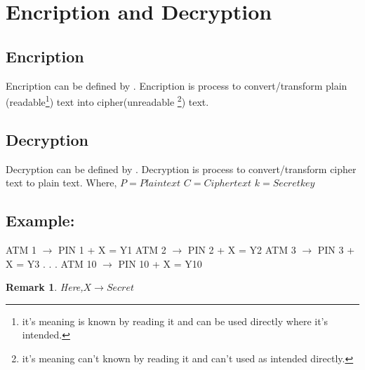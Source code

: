 \documentclass[11pt]{article}
\newtheorem{remark}{Remark}
\begin{document}
\section{Encription and Decryption}
\begin{multicols}{2}

    \subsection{Encription}
    
    Encription can be defined by {}.\newline
    Encription is process to convert/transform plain
    (readable\footnote[2]{it's meaning is known by reading it and can be used directly where it's intended.})
    text into
    cipher(unreadable
    \footnote[3]{it's meaning can't known by reading it and can't used as intended directly.})
     text.
    
    \subsection{Decryption}
    Decryption can be defined by {}. \newline
    Decryption is process to convert/transform cipher text to plain text.
    \newline\newline
    Where, \newline
    $P = Plain text$ \newline
    $C = Cipher text$ \newline
    $k = Secret key$ \newline

    \columnbreak

    \subsection{Example:}

    ATM 1 $\rightarrow$ PIN 1 + X = Y1  \newline
    ATM 2 $\rightarrow$ PIN 2 + X = Y2  \newline
    ATM 3 $\rightarrow$ PIN 3 + X = Y3  \newline
    . \newline
    . \newline
    . \newline
    ATM 10 $\rightarrow$ PIN 10 + X = Y10 \newline

    \begin{remark}
        Here,$X \rightarrow Secret$
    \end{remark}
\end{multicols}
\end{document}
